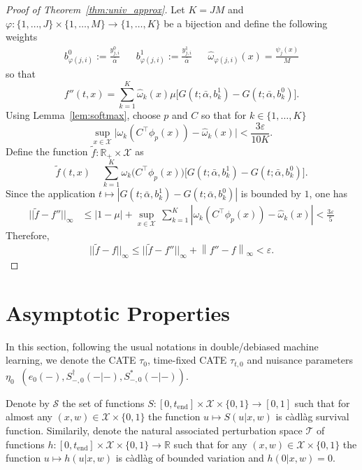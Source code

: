 \documentclass{article}
\DeclareMathOperator*{\eqdef }{\,\stackrel{\text{def}}{=}\,}
\newcommand{\abs}[1]{\left\lvert #1 \right\rvert}
\newcommand{\norm}[1]{\left\lVert#1\right\rVert}
\newcommand{\tend}{t_{\mathrm{end}}}
\newcommand{\R}{\mathbb{R}}
\newcommand{\mcl}{\mathcal}
\begin{document}
\begin{proof}[Proof of Theorem~\ref{thm:univ_approx}]
Let $K = JM$ and $\varphi: \{1,\dots,J\}\times\{1,\dots,M\} \to \{1,\ldots,K\}$ be a bijection and define the following weights
\begin{align*}
b_{\varphi(j,i)}^0:= \frac{y_{j,i}^0}{\bar\alpha} && b_{\varphi(j,i)}^1:= \frac{y_{j,i}^1}{\bar\alpha} && \widehat\omega_{\varphi(j,i)}(x) = \frac{\psi_j(x)}{M}
\end{align*}
so that
\[ f''(t,x) = \sum_{k=1}^K \widehat\omega_k(x) \mu \Big[G(t;\bar\alpha,b_k^1)- G(t;\bar\alpha,b_k^0)\Big].\]
Using Lemma~\ref{lem:softmax}, choose $p$ and $C$ so that for $k \in \{1,\ldots,K\}$
\[ \sup_{x \in \mathcal{X}} \Big\vert \omega_k(C^\top\phi_p(x))- \widehat\omega_k(x) \Big\vert  < \frac{3\varepsilon}{10 K}. \]
Define the function $\widetilde f: \R_{+} \times \mathcal{X}$ as
\[
  \widetilde f(t,x) \;\eqdef\; \sum_{k=1}^K \omega_k\!\big(C^\top\phi_p(x)\big) \Big[G(t;\bar\alpha,b_k^1)-G(t;\bar\alpha,b_k^0)\Big].
\]
Since the application $t \mapsto |G(t;\bar\alpha,b_k^1)-G(t;\bar\alpha,b_k^0)|$ is bounded by $1$, one has
\begin{align*}
  ||\widetilde f- f''||_\infty &\le  \abs{1-\mu} +  \sup_{x \in \mathcal{X}} \, \sum_{k=1}^K\abs{\omega_k(C^\top\phi_p(x))-\widehat\omega_k(x)} < \frac{3 \varepsilon}{5}
\end{align*}
Therefore,
\[
  ||\widetilde f-f||_\infty
  \le || \widetilde f- f''||_\infty +\norm{ f''-f}_\infty
  < \varepsilon.
\]
\end{proof}

\section{Asymptotic Properties}\label{appendix:asymptotic}


In this section, following the usual notations in double/debiased machine learning, we
denote the CATE $\tau_0$, time-fixed CATE $\tau_{t,0}$ and nuisance parameters 
$\eta_0 \eqdef (e_0(-), S^\dagger_{-,0}(-|-), S^*_{-,0}(-|-))$.

\medskip

Denote by $\mathscr{S}$ the set of functions $S: [0,\tend] \times \mcl{X} \times \{0,1\} \to [0,1]$ such that
for almost any $(x,w) \in \mcl{X} \times \{0,1\}$ the function $u \mapsto S(u|x,w)$ is càdlàg survival function. Similarily, denote the natural associated perturbation space $\mathscr{T}$  of functions $h : [0,\tend] \times \mcl{X} \times \{0,1\} \to \R$ such that
for any $(x,w) \in \mcl{X} \times \{0,1\}$ the function $u \mapsto h(u|x,w)$ is càdlàg of bounded variation and $h(0|x,w) = 0$.
\end{document}
